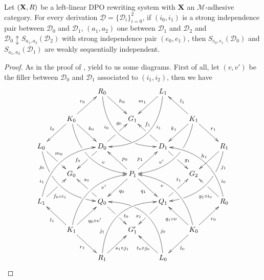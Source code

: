 \documentclass[a4paper,UKenglish,cleveref,pdftex, thm-restate,numberwithinsect,anonymous]{lipics}
\def\R{\mathsf{R}}
\def\X{\textbf {\textup{X}}}
\newcommand{\dder}[1]{\mathscr{#1}}
\newcommand{\der}[1]{\underline{\dder{#1}}}
\begin{document}

	\begin{lemma}\label{lem:iig2}Let $(\X,\R)$ be a left-linear DPO rewriting system with $\X$ an $\mathcal{M}$-adhesive category. For every derivation $\der{D}=\{\dder{D}_i\}_{i=0}^2$, if $(i_0,i_1)$ is a strong independence pair between $\dder{D}_0$ and $\dder{D}_1$, $(a_1,a_2)$ one between $\dder{D}_1$ and $\dder{D}_2$ and $\dder{D}_0\updownarrow S_{a_1,a_2}(\dder{D}_2)$ with strong independence pair $(e_0,e_1)$, then $S_{e_0,e_1}(\dder{D}_0)$ and $S_{a_1,a_2}(\dder{D}_1)$ are weakly sequentially independent.
	\end{lemma}
	\begin{proof} As in the proof of ,  yield to us some diagrams.  First of all, let $(v,v')$ be the filler between $\dder{D}_0$ and $\dder{D}_1$ associated to $(i_1, i_2)$, then we have
		\[\xymatrix{&&R_0 \ar@/_1cm/[ddrr]_(.35){i_0}|(.7)\hole \ar[dr]^{h_0}&& L_1\ar@/^1cm/[ddll]^(.35){i_1}  \ar[dl]_{m_1}\\&K_0\ar[dr]^{k_0}\ar[dl]_{l_0} \ar@/_.8cm/[ddrr]|(.36)\hole^(.65){v}\ar[ur]^{r_0}&& G_1 && K_1 \ar@/^.8cm/[ddll]|(.36)\hole_(.65){v'}\ar[dl]_{k_1}\ar[lu]_{l_1} \ar[dr]^{r_1}\\L_0 \ar@/_.8cm/[ddrr]_(.2){j_0}|(.31)\hole|(.81)\hole \ar[dr]^(.4){m_0}|(.61)\hole && D_0 \ar[dl]|(.4)\hole_(.65){f_0}\ar[ur]|(.5)\hole^(.7){g_0}&&D_1 \ar[dr]|(.4)\hole^(.65){g_1} \ar[ul]|(.5)\hole_(.65){f_1}&&R_1\ar@/^.8cm/[ddll]^(.2){j_1}|(.31)\hole|(.81)\hole\ar[dl]_{h_1}\\&G_0 &&P_1\ar[dr]_{q_1} \ar[dl]^{q_0}\ar[ur]^(.4){p_1}\ar[ul]_(.4){p_0}&&G_2\\L_1 \ar@/^.8cm/[uurr]^(.2){i_1} \ar[ur]_(.35){f_0\circ i_1}|(.61)\hole&&Q_0 \ar[ul]|(.4)\hole_(.65){s_0}\ar[dr]|(.5)\hole^(.65){t_0} &&Q_1\ar[ur]|(.4)\hole^(.65){t_1} \ar[dl]|(.5)\hole_(.65){s_1} && R_0  \ar[ul]^(.35){g_1\circ i_0}|(.61)\hole\ar@/_.8cm/[uull]_(.2){i_0}\\&K_1 \ar[ur]_{q_0\circ v'} \ar[dr]_{r_1} \ar[ul]^{l_1}\ar@/^.8cm/[uurr]_(.65){v'}&&G'_1&& K_0 \ar[ur]_{r_0} \ar[ul]^{q_1\circ v} \ar[dl]^{l_0} \ar@/_.8cm/[uull]^(.65){v}\\&& R_1 \ar[ur]_{\hspace{-5pt}s_1\circ j_1}\ar@/^1cm/[uurr]^(.25){j_1}&& L_0 \ar[ul]^{t_0\circ j_0\hspace{-5pt}} \ar@/_1cm/[uull]_(.25){j_0} |(.69)\hole }\]


\end{proof}
\end{document}
